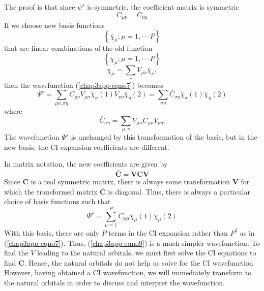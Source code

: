 The proof is that since $\psi^s$ is symmetric, the coefficient matrix is 
symmetric
\begin{equation}
C_{\mu \nu} = C_{\nu \mu}
\end{equation}
If we choose new basis functions
\begin{equation}
\left\{ {\bar \chi}_{\mu} ; \mu = 1 , \cdot \cdot \cdot P \right\}
\end{equation}
that are linear combinations of the old function
\begin{equation}
\left\{ \chi_{\mu} ; \mu = 1 , \cdot \cdot \cdot P \right\}
\end{equation}
\begin{equation}
\chi_{\mu} = \sum_{\nu} V_{\mu \nu} {\bar \chi}_{\nu},
\end{equation}
then the wavefunction (\ref{chap3app-eqno7}) becomes
\begin{equation}
\Psi^s = \sum_{\mu \nu ,\sigma \eta} C_{\mu \nu} V_{\mu \sigma} 
{\bar \chi}_{\sigma} (1) V_{\nu \eta} {\bar \chi}_{\eta} (2) = 
\sum_{\sigma \eta} {\bar C}_{\sigma \eta} {\bar \chi}_{\sigma} (1) 
{\bar \chi}_{\eta} (2)
\end{equation}
where
\begin{equation}
{\bar C}_{\sigma \eta} = \sum_{\mu , \nu} V_{\mu \sigma} C_{\mu 
\nu} V_{\nu \eta} .
\end{equation}
The wavefunction $\Psi^s$ is unchanged by this transformation of the basis, 
but in the new basis, the CI expansion coefficients 
are different.

In matrix notation, the new coefficients are given by
\begin{equation}
\mathbf{\bar C} = \mathbf{{\tilde V}CV}
\end{equation}
Since $\mathbf{C}$ is a real symmetric matrix, there is always some 
transformation $\mathbf{V}$ for which the transformed matrix 
$\mathbf{\bar C}$ is diagonal.  Thus, there is always a particular choice 
of basis functions such that
\begin{equation}
\Psi^s = \sum^{P}_{\mu =1} {\bar C}_{\mu \mu} {\bar \chi}_{\mu} (1) 
{\bar \chi}_{\mu} (2)
\label{chap3app-eqno9}
\end{equation}
With this basis, there are only $P$ terms in the CI expansion rather
than $P^2$ as in (\ref{chap3app-eqno7}).  Thus, (\ref{chap3app-eqno9})
is a much simpler wavefunction.  To find the $V$ leading to the
natural orbitals, we must first solve the CI equations to find
$\mathbf{C}$.  Hence, the natural orbitals do not help us solve for
the CI wavefunction.  However, having obtained a CI wavefunction, we
will immediately transform to the natural orbitals in order to discuss
and interpret the wavefunction.

